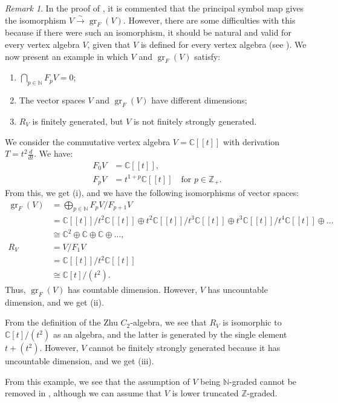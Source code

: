 \documentclass[a4paper, 12pt, reqno]{amsart}
\theoremstyle{remark}
\newtheorem{remark}[theorem]{Remark}
\DeclareMathOperator{\gr}{gr}
\begin{document}
\begin{remark}
  \label{rmk:47}
  In the proof of \cite[Corollary 2.6.2]{arakawa_remark_2012}, it is commented that the principal symbol map gives the isomorphism $V \xrightarrow{\sim} \gr_F(V)$.
  However, there are some difficulties with this because if there were such an isomorphism, it should be natural and valid for every vertex algebra $V$, given that $V$ is defined for every vertex algebra (see ).
  We now present an example in which $V$ and $\gr_F(V)$ satisfy:
  \begin{enumerate}
  \item $\bigcap_{p \in \mathbb{N}}F_pV = 0$;
  \item The vector spaces $V$ and $\gr_F(V)$ have different dimensions;
  \item $R_V$ is finitely generated, but $V$ is not finitely strongly generated.
  \end{enumerate}
  We consider the commutative vertex algebra $V = \mathbb{C}[[t]]$ with derivation $T = t^2\frac{d}{dt}$.
  We have:
  \begin{align*}
    F_0V &= \mathbb{C}[[t]], \\
    F_pV &= t^{1 + p}\mathbb{C}[[t]] \quad \text{for $p \in \mathbb{Z}_+$}.
  \end{align*}
  From this, we get (i), and we have the following isomorphisms of vector spaces:
  \begin{align*}
    \gr_F(V) &= \bigoplus_{p \in \mathbb{N}}F_pV/F_{p + 1}V \\
             &= \mathbb{C}[[t]]/t^2\mathbb{C}[[t]] \oplus t^2\mathbb{C}[[t]]/t^3\mathbb{C}[[t]] \oplus t^3\mathbb{C}[[t]]/t^4\mathbb{C}[[t]] \oplus \dots \\
             &\cong \mathbb{C}^2 \oplus \mathbb{C} \oplus \mathbb{C} \oplus \dots, \\
    R_V &= V/F_1V \\
             &= \mathbb{C}[[t]]/t^2\mathbb{C}[[t]] \\
             &\cong \mathbb{C}[t]/(t^2).
  \end{align*}
  Thus, $\gr_F(V)$ has countable dimension.
  However, $V$ has uncountable dimension, and we get (ii).

  From the definition of the Zhu $C_2$-algebra, we see that $R_V$ is isomorphic to $\mathbb{C}[t]/(t^2)$ as an algebra, and the latter is generated by the single element $t + (t^2)$.
  However, $V$ cannot be finitely strongly generated because it has uncountable dimension, and we get (iii).

  From this example, we see that the assumption of $V$ being $\mathbb{N}$-graded cannot be removed in , although we can assume that $V$ is lower truncated $\mathbb{Z}$-graded.
\end{remark}
\end{document}
